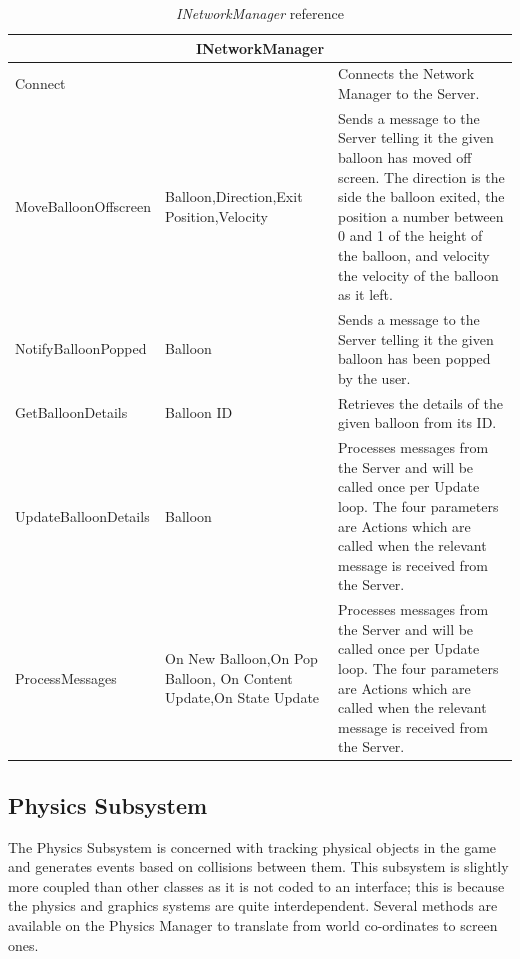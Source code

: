 \begin{table}[H]
\begin{tabular}{|p{4.8cm}|p{3.8cm}|p{7cm}|}
\hline
\multicolumn{3}{|c|}{INetworkManager} \\ \hline
Connect & & Connects the Network Manager to the Server. \\ \hline

MoveBalloonOffscreen & Balloon,\newline Direction,\newline Exit Position,\newline Velocity &
Sends a message to the Server telling it the given balloon has moved off 
screen. The direction is the side the balloon exited, the position a number 
between 0 and 1 of the height of the balloon, and velocity the velocity of the
balloon as it left. \\ \hline

NotifyBalloonPopped & Balloon & 
Sends a message to the Server telling it the given balloon has been popped by
the user. \\ \hline

GetBalloonDetails & Balloon ID &
Retrieves the details of the given balloon from its ID. \\ \hline

UpdateBalloonDetails & Balloon & 
Processes messages from the Server and will be called once per Update loop.
The four parameters are Actions which are called when the relevant message is
received from the Server. \\ \hline

ProcessMessages & On New Balloon,\newline On Pop Balloon,
\newline On Content Update,\newline On State 
Update &
Processes messages from the Server and will be called once per Update loop. 
The four parameters are Actions which are called when the relevant message is
received from the Server. \\ \hline
\end{tabular}

\caption{\emph{INetworkManager} reference}

\label{NetworkManagerRef}
\end{table}

\clearpage{}
\subsection{Physics Subsystem}
The Physics Subsystem is concerned with tracking physical objects in the game
and generates events based on collisions between them. This subsystem is 
slightly more coupled than other classes as it is not coded to an interface; 
this is because the physics and graphics systems are quite interdependent. 
Several methods are available on the Physics Manager to translate from world 
co-ordinates to screen ones. 

